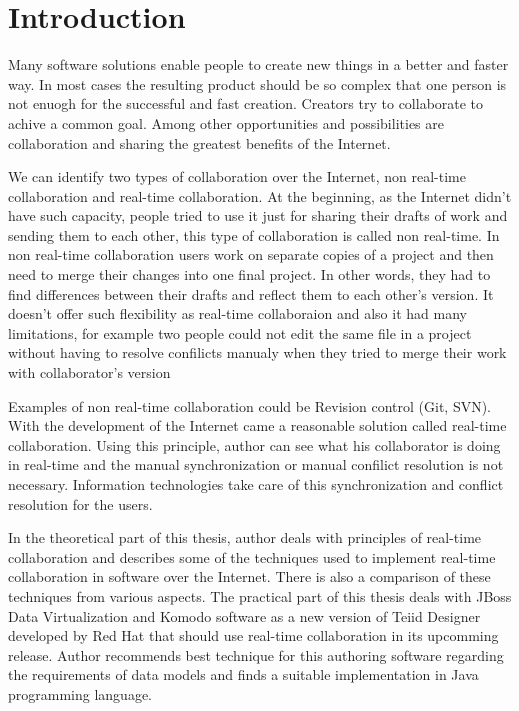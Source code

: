 \documentclass[12pt,oneside]{fithesis2}
\begin{document}
\FrontMatter
\ThesisTitlePage
\begin{ThesisDeclaration}
\DeclarationText
\AdvisorName
\end{ThesisDeclaration}
\begin{ThesisThanks}
\end{ThesisThanks}
\begin{ThesisAbstract}
\end{ThesisAbstract}
\begin{ThesisKeyWords}
\end{ThesisKeyWords}
\tableofcontents 
\MainMatter
\chapter{Introduction} 
Many software solutions enable people to create new things in a better and faster way. In most cases the resulting product should be so complex that one person is not enuogh for the successful and fast creation. Creators try to collaborate to achive a common goal. Among other opportunities and possibilities are collaboration and sharing the greatest benefits of the Internet. \par
We can identify two types of collaboration over the Internet, non real-time collaboration and real-time collaboration. At the beginning, as the Internet didn't have such capacity, people tried to use it just for sharing their drafts of work and sending them to each other, this type of collaboration is called non real-time. In non real-time collaboration users work on separate copies of a project and then need to merge their changes into one final project. In other words, they had to find differences between their drafts and reflect them to each other's version. It doesn't offer such flexibility as real-time collaboraion and also it had many limitations, for example two people could not edit the same file in a project without having to resolve confilicts manualy when they tried to merge their work with collaborator's version\par
Examples of non real-time collaboration could be Revision control (Git, SVN).
With the development of the Internet came a reasonable solution called real-time collaboration. Using this principle, author can see what his collaborator is doing in real-time and the manual synchronization or manual confilict resolution is not necessary. Information technologies take care of this synchronization and conflict resolution for the users.\par
In the theoretical part of this thesis, author deals with principles of real-time collaboration and describes some of the techniques used to implement real-time collaboration in software over the Internet. There is also a comparison of these techniques from various aspects. The practical part of this thesis deals with JBoss Data Virtualization and Komodo software as a new version of Teiid Designer developed by Red Hat that should use real-time collaboration in its upcomming release. Author recommends best technique for this authoring software regarding the requirements of data models and finds a suitable implementation in Java programming language.
\end{document}
